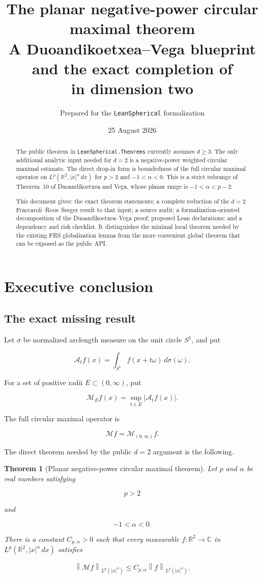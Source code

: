 \documentclass[11pt,a4paper]{article}
\title{\textbf{The planar negative-power circular maximal theorem}\\[4pt]
\large A Duoandikoetxea--Vega blueprint and the exact completion of\\
\lean{PowerWeights.closure\_typeSet\_eq} in dimension two}
\author{Prepared for the \texttt{LeanSpherical} formalization}
\date{25 August 2026}
\newtheorem{theorem}{Theorem}[section]
\theoremstyle{definition}
\theoremstyle{remark}
\newcommand{\R}{\mathbb{R}}
\newcommand{\C}{\mathbb{C}}
\newcommand{\M}{\mathcal{M}}
\newcommand{\A}{\mathcal{A}}
\newcommand{\norm}[1]{\left\lVert #1\right\rVert}
\newcommand{\abs}[1]{\left\lvert #1\right\rvert}
\begin{document}
\maketitle

\begin{abstract}
The public theorem in \texttt{LeanSpherical.Theorems} currently assumes
$d\geq 3$.  The only additional analytic input needed for $d=2$ is a
negative-power weighted circular maximal estimate.  The direct drop-in form is
boundedness of the full circular maximal operator on
$L^p(\R^2,\abs{x}^{\alpha}\,dx)$ for $p>2$ and $-1<\alpha<0$.  This is a
strict subrange of Theorem~10 of Duoandikoetxea and Vega, whose planar range is
$-1<\alpha<p-2$.

This document gives: the exact theorem statements; a complete reduction of the
$d=2$ Fraccaroli--Roos--Seeger result to that input; a source audit; a
formalization-oriented decomposition of the Duoandikoetxea--Vega proof; proposed
Lean declarations; and a dependency and risk checklist.  It distinguishes the
minimal local theorem needed by the existing FRS globalization lemma from the
more convenient global theorem that can be exposed as the public API.
\end{abstract}

\tableofcontents
\newpage

\section{Executive conclusion}

\subsection{The exact missing result}

Let $\sigma$ be normalized arclength measure on the unit circle $S^1$, and put

\[
\A_t f(x)=\int_{S^1} f(x+t\omega)\,d\sigma(\omega).
\]

For a set of positive radii $E\subset(0,\infty)$, put

\[
\M_E f(x)=\sup_{t\in E}\abs{\A_t f(x)}.
\]

The full circular maximal operator is

\[
\M f=\M_{(0,\infty)}f.
\]

The direct theorem needed by the public $d=2$ argument is the following.

\begin{theorem}[Planar negative-power circular maximal theorem]\label{thm:direct-missing}
Let $p$ and $\alpha$ be real numbers satisfying

\[
p>2
\]

and

\[
-1<\alpha<0.
\]

There is a constant $C_{p,\alpha}>0$ such that every measurable
$f:\R^2\to\C$ in $L^p(\R^2,\abs{x}^{\alpha}\,dx)$ satisfies

\[
\norm{\M f}_{L^p(\abs{x}^{\alpha})}
\leq C_{p,\alpha}\norm{f}_{L^p(\abs{x}^{\alpha})}.
\]
\end{theorem}
\end{document}
